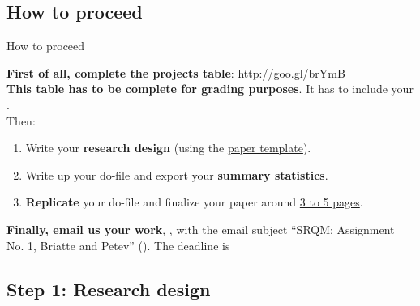 \documentclass{beamer}
\begin{document}
	\subsection{How to proceed}
	
	
	\begin{frame}[t]{How to proceed}
	
	\textbf{First of all, complete the projects table}: \url{http://goo.gl/brYmB}\\[1em]
	
	\textbf{This table has to be complete for grading purposes}. It has to include your .\\[1em]
	
	Then:
	
	\begin{enumerate}
		\item Write your \textbf{research design} (using the \href{http://goo.gl/7u8oa}{paper template}).
		\item Write up your do-file and export your \textbf{summary statistics}.
		\item \textbf{Replicate} your do-file and finalize your paper around \underline{3 to 5 pages}.\\[1em]
	\end{enumerate}
	
	\textbf{Finally, email us your work}, , with the email subject ``SRQM: Assignment No. 1, Briatte and Petev'' (). The deadline is 
	
	\end{frame}

	\subsection{Step 1: Research design}

\end{document}
